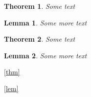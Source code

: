 \documentclass{article}
\newtheorem{theorem}{Theorem}
\newtheorem{lemma}[lemma]{Lemma}
\begin{document}
\begin{theorem}\label{thm}
Some text
\end{theorem}

\begin{lemma}\label{lem}
Some more text
\end{lemma}

\begin{theorem}
Some text
\end{theorem}

\begin{lemma}
Some more text
\end{lemma}

\autoref{thm}

\autoref{lem}
\end{document}
